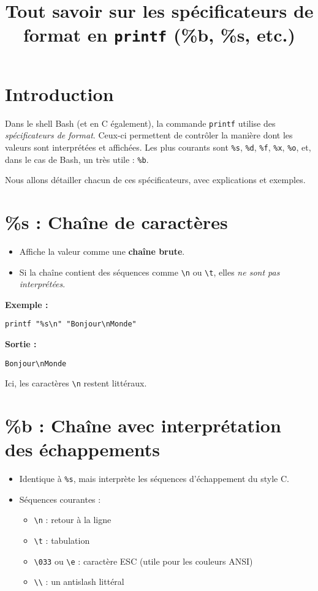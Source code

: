 \documentclass[11pt,a4paper]{article}
\title{Tout savoir sur les spécificateurs de format en \texttt{printf} (\%b, \%s, etc.)}
\author{}
\date{}
\begin{document}
\maketitle

\section*{Introduction}
Dans le shell Bash (et en C également), la commande \texttt{printf} utilise des \emph{spécificateurs de format}. Ceux-ci permettent de contrôler la manière dont les valeurs sont interprétées et affichées. Les plus courants sont \texttt{\%s}, \texttt{\%d}, \texttt{\%f}, \texttt{\%x}, \texttt{\%o}, et, dans le cas de Bash, un très utile : \texttt{\%b}. 

Nous allons détailler chacun de ces spécificateurs, avec explications et exemples.

\section*{\%s : Chaîne de caractères}
\begin{itemize}
  \item Affiche la valeur comme une \textbf{chaîne brute}.
  \item Si la chaîne contient des séquences comme \texttt{\textbackslash n} ou \texttt{\textbackslash t}, elles \emph{ne sont pas interprétées}.
\end{itemize}

\textbf{Exemple :}
\begin{lstlisting}
printf "%s\n" "Bonjour\nMonde"
\end{lstlisting}

\textbf{Sortie :}
\begin{verbatim}
Bonjour\nMonde
\end{verbatim}

Ici, les caractères \verb|\n| restent littéraux.

\section*{\%b : Chaîne avec interprétation des échappements}
\begin{itemize}
  \item Identique à \texttt{\%s}, mais interprète les séquences d’échappement du style C.
  \item Séquences courantes :
  \begin{itemize}
    \item \verb|\n| : retour à la ligne
    \item \verb|\t| : tabulation
    \item \verb|\033| ou \verb|\e| : caractère ESC (utile pour les couleurs ANSI)
    \item \verb|\\| : un antislash littéral
  \end{itemize}
\end{itemize}
\end{document}
